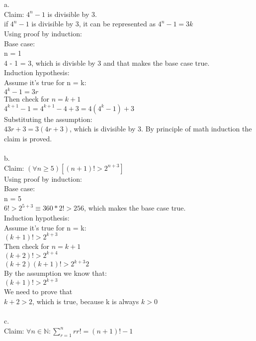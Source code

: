 \documentclass{article}
\begin{document}
\section{}
a.\\
Claim: $4^n - 1$ is divisible by 3.\\
if $4^n - 1$ is divisible by 3, it can be represented as $4^n -1 = 3k$\\
Using proof by induction:\\
Base case:\\
n = 1\\
4 - 1 = 3, which is divisble by 3 and that makes the base case true.\\
Induction hypothesis:\\
Assume it's true for n = k:\\
$4^k - 1 = 3r$\\
Then check for $n = k + 1$\\
$4^{k+1} - 1 = 4^{k+1} - 4 + 3 = 4(4^k -1) + 3$\\
Substituting the assumption:\\
$43r + 3 = 3(4r + 3)$, which is divisible by 3. By principle of math induction the claim is proved.\\
\\
b.\\
Claim: $(\forall n \geq 5)[(n + 1)! > 2^{n+3}]$\\
Using proof by induction:\\
Base case:\\
n = 5\\
$6! > 2^{5 + 3} \equiv 360*2! > 256$, which makes the base case true.\\
Induction hypothesis:\\
Assume it's true for n = k:\\
$(k + 1)! > 2^{k + 3}$\\
Then check for $n = k + 1$\\
$(k + 2)! > 2^{k + 4}$\\
$(k+2)(k+1)! > 2^{k+3}2$\\
By the assumption we know that:\\
$(k+1)! > 2^{k+3}$\\
We need to prove that\\
$k + 2 > 2$, which is true, because k is always $k > 0$\\
\\
c.\\
Claim: $\forall n \in \mathbb{N}: \sum_{r=1}^nrr! = (n + 1)! - 1$\\
\end{document}
